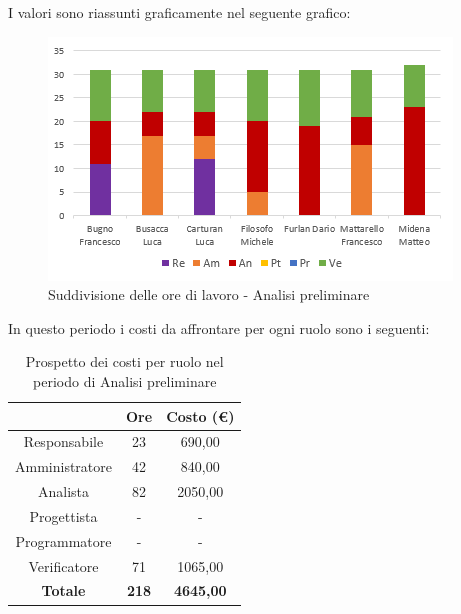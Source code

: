 I valori sono riassunti graficamente nel seguente grafico:

\begin{figure}[H]
  \centering
  \includegraphics[scale=1.2]{immagini/ore_lavoro_analisi.png}
  \caption{Suddivisione delle ore di lavoro - Analisi preliminare}
\end{figure}

\pagebreak
In questo periodo i costi da affrontare per ogni ruolo sono i seguenti:

\begin{table}[H]
  \centering
  \renewcommand{\arraystretch}{1.8}
  \begin{tabular}{c|c|c}
    \rowcolor[HTML]{125E28}
    \multicolumn{1}{c}{\color[HTML]{FFFFFF}\textbf{Ruolo}}
                    & \multicolumn{1}{c}{\color[HTML]{FFFFFF}\textbf{Ore}}
                    & \multicolumn{1}{c}{\color[HTML]{FFFFFF}\textbf{Costo (€)}}                    \\
    \hline
    Responsabile    & 23                                                         & 690,00           \\
    Amministratore  & 42                                                         & 840,00           \\
    Analista        & 82                                                         & 2050,00          \\
    Progettista     & -                                                          & -                \\
    Programmatore   & -                                                          & -                \\
    Verificatore    & 71                                                         & 1065,00          \\
    \textbf{Totale} & \textbf{218}                                               & \textbf{4645,00}
  \end{tabular}
  \caption{Prospetto dei costi per ruolo nel periodo di Analisi preliminare}
\end{table}


